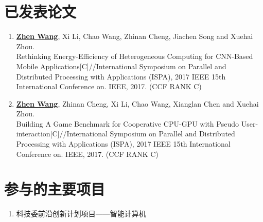\begin{publications}

\section*{已发表论文}

\begin{enumerate}
\item \textbf{\underline{Zhen Wang}}, Xi Li, Chao Wang, Zhinan Cheng, Jiachen Song and Xuehai Zhou.\\
Rethinking Energy-Efficiency of Heterogeneous Computing for CNN-Based Mobile Applications[C]//International Symposium on Parallel and Distributed Processing with Applications (ISPA), 2017 IEEE 15th International Conference on. IEEE, 2017. (CCF RANK C)
\item \textbf{\underline{Zhen Wang}}, Zhinan Cheng, Xi Li, Chao Wang, Xianglan Chen and Xuehai Zhou.\\
Building A Game Benchmark for Cooperative CPU-GPU with Pseudo User-\\interaction[C]//International Symposium on Parallel and Distributed Processing with Applications (ISPA), 2017 IEEE 15th International Conference on. IEEE, 2017. (CCF RANK C)
\end{enumerate}


\section*{参与的主要项目}
\begin{enumerate}
\item 科技委前沿创新计划项目——智能计算机
\end{enumerate}

\end{publications}
